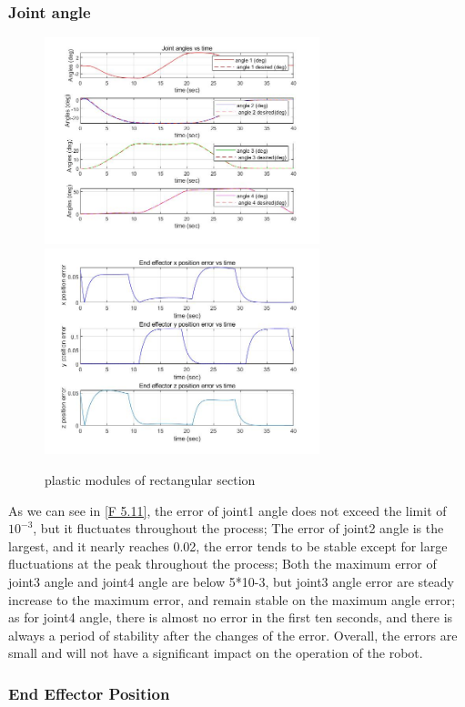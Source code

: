 \subsubsection*{Joint angle}




\begin{figure}[htbp]
	\centering
	\includegraphics[width=8cm]{./fig/4.jpg}
	\includegraphics[width=8cm]{./fig/6.jpg}
	\caption{plastic modules of rectangular section}
	\label{F 5.11}
\end{figure}

As we can see in \autoref{F 5.11}, the error of joint1 angle does not exceed the limit of $10^{-3}$, but it fluctuates throughout the process;
The error of joint2 angle is the largest, and it nearly reaches 0.02, the error tends to be stable except for large fluctuations at the peak throughout the process;
Both the maximum error of joint3 angle and joint4 angle are below 5*10-3, but joint3 angle error are steady increase to the maximum error, and remain stable on the maximum angle error; as for joint4 angle, there is almost no error in the first ten seconds, and there is always a period of stability after the changes of the error.
Overall, the errors are small and will not have a significant impact on the operation of the robot.

\subsubsection*{End Effector Position}


